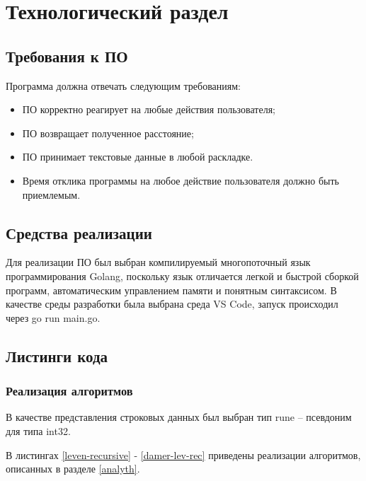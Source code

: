 \chapter{Технологический раздел}

\section{Требования к ПО}
Программа должна отвечать следующим требованиям:
\begin{itemize}
	\item ПО корректно реагирует на любые действия пользователя;
	\item ПО возвращает полученное расстояние;
	\item ПО принимает текстовые данные в любой раскладке.
	\item Время отклика программы на любое действие пользователя должно быть приемлемым.
\end{itemize}
\section{Средства реализации}
Для реализации ПО был выбран компилируемый многопоточный язык программирования Golang, поскольку язык отличается легкой и быстрой сборкой программ, автоматическим управлением памяти и понятным синтаксисом.
В качестве среды разработки была выбрана среда VS Code, запуск происходил через go run main.go.

\section{Листинги кода}
\subsection{Реализация алгоритмов}

В качестве представления строковых данных был выбран тип rune\cite{rune} -- псевдоним для типа int32. 

В листингах \ref{leven-recursive} - \ref{damer-lev-rec} приведены реализации алгоритмов, описанных в разделе \ref{analyth}.


